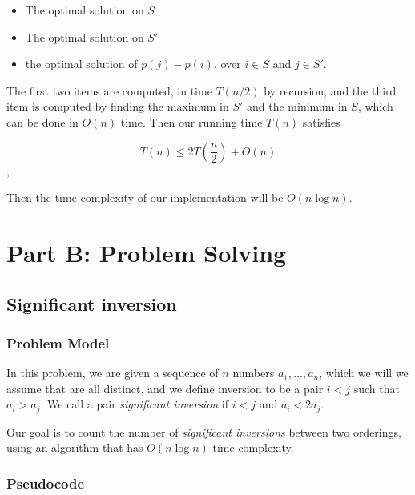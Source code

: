 \documentclass{article}
\begin{document}
\begin{itemize}
 \item The optimal solution on $S$
 \item The optimal solution on $S'$
 \item the optimal solution of $p(j)-p(i)$, over $i \in S$ and $j \in S'$.
\end{itemize}

The first two items are computed, in time $T(n/2)$ by recursion, and the third item is computed by finding the maximum in $S'$ and the minimum in $S$, which can be done in $O(n)$ time. Then our running time $T(n)$ satisfies

$$T(n) \leq 2T(\frac{n}{2})+O(n)$$,

Then the time complexity of our implementation will be $O(n\log n)$.


\section*{Part B: Problem Solving}

\subsection*{Significant inversion}

\subsubsection*{Problem Model}

In this problem, we are given a sequence of $n$ numbers $a_1,...,a_n$, which we will we assume that are all distinct, and we define inversion to be a pair $i<j$ such that $a_i>a_j$. We call a pair \textit{significant inversion} if $i<j$ and $a_i<2a_j$.

Our goal is to count the number of \textit{significant inversions} between two orderings, using an algorithm that has $O(n \log n)$ time complexity.

\subsubsection*{Pseudocode}
\end{document}
